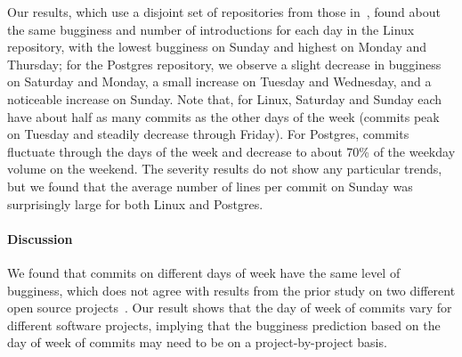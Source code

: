 Our results, which use a disjoint set of repositories from those
in~\cite{sliwerski-msr-2005}, found about the same bugginess and 
number of introductions for each
day in the Linux repository, with the lowest bugginess on Sunday and
highest on Monday and Thursday; for the Postgres repository, we
observe a slight decrease in bugginess on Saturday and Monday, a small
increase on Tuesday and Wednesday, and a noticeable increase on
Sunday.  Note that, for Linux, Saturday and Sunday each have about
half as many commits as the other days of the week (commits peak on
Tuesday and steadily decrease through Friday). For Postgres, commits
fluctuate through the days of the week and decrease to about 70\% of
the weekday volume on the weekend. The severity results do not show
any particular trends, but we found that the average number of lines
per commit on Sunday was surprisingly large for both Linux and Postgres.

\paragraph{Discussion}
We found that commits on different days of week have the same level of bugginess, which
does not agree with results from the prior study on two different open source projects~\cite{sliwerski-msr-2005}.  
Our result shows that the day of week of commits
vary for different software projects, implying that the bugginess prediction based on 
the day of week of commits may need to be on a project-by-project basis.






